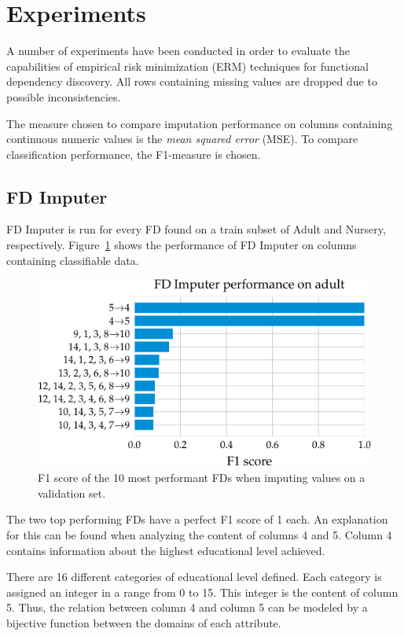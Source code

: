 \newpage
\section{Experiments}
A number of experiments have been conducted in order to evaluate the capabilities of empirical risk minimization (ERM) techniques for functional dependency discovery.
All rows containing missing values are dropped due to possible inconsistencies.

The measure chosen to compare imputation performance on columns containing continuous numeric values is the \emph{mean squared error} (MSE).
To compare classification performance, the F1-measure is chosen.

\subsection{FD Imputer}
FD Imputer is run for every FD found on a train subset of Adult and Nursery, respectively.
Figure~\ref{fig:f1_fd_adult} shows the performance of FD Imputer on columns containing classifiable data.
\begin{figure}[ht]
     \centering
     \includegraphics[width=.8\textwidth]{../figures/adult/f1_fd_imputer_adult.pdf}
     \caption{F1 score of the 10 most performant FDs when imputing values on a validation set.}
     \label{fig:f1_fd_adult}
 \end{figure}
The two top performing FDs have a perfect F1 score of 1 each.
An explanation for this can be found when analyzing the content of columns 4 and 5.
Column 4 contains information about the highest educational level achieved.

There are 16 different categories of educational level defined.
Each category is assigned an integer in a range from 0 to 15.
This integer is the content of column 5.
Thus, the relation between column 4 and column 5 can be modeled by a bijective function between the domains of each attribute.

